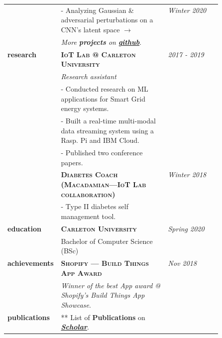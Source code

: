 \documentclass[9pt]{article}
\begin{document}
\begin{longtable}{@{}>{\raggedleft}p{0.25\linewidth}
                          p{}>{}p{0.25\linewidth}@{}}
            & - Analyzing Gaussian \& adversarial perturbations on a CNN's latent space \href{https://github.com/boshd/advatck}{$\rightarrow$} & \textit{Winter 2020} \\ [0.5em]

            & \textit{More \textbf{projects} on \href{https://github.com/boshd}{\textbf{github}}}.\\ [1em]

        \textbf{research}
            & \textbf{\textsc{IoT Lab @ Carleton University}} & \textit{2017 - 2019} \\
            & \textit{Research assistant} \\
            & - Conducted research on ML applications for Smart Grid energy systems. \\
            & - Built a real-time multi-modal data streaming system using a Rasp. Pi and IBM Cloud. \\
            & - Published two conference papers. \\
            [0.5em]

            & \textbf{\textsc{Diabetes Coach (Macadamian---IoT Lab collaboration)}} & \textit{Winter 2018} \\
            & - Type II diabetes self management tool. \\ [1em]

        \textbf{education}
            & \textbf{\textsc{Carleton University}} & \textit{Spring 2020} \\
            & Bachelor of Computer Science (BSc) \\ [1em]

        \textbf{achievements}
            & \textbf{\textsc{Shopify --- Build Things App Award}} & \textit{Nov 2018} \\
            & \textit{Winner of the best App award @ Shopify's Build Things App Showcase}. \\ [1em]

        \textbf{publications}
            & ** List of \textbf{Publications} on \textit{\href{https://scholar.google.ca/citations?user=zFDREhgAAAAJ\&hl=en}{\textbf{Scholar}}}.\\ [0.5em]


  \end{longtable}
\end{document}
